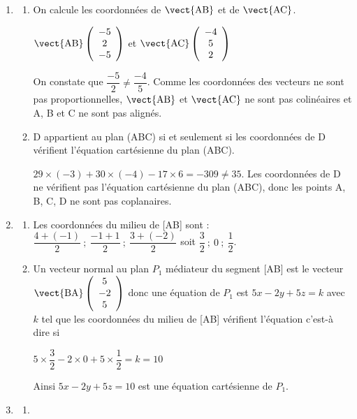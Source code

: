\begin{enumerate}
	\item 
	\begin{enumerate}
		\item On calcule les coordonnées de $\vect{\text{AB}}$ et de $\vect{\text{AC}}$.
		
		$\vect{\text{AB}}\left(
		\begin{array}{c}
		-5\\
		2\\
		-5
		\end{array}
		\right)$
et
		$\vect{\text{AC}}\left(
		\begin{array}{c}
		-4\\
		5\\
		2
		\end{array}
		\right)$
		
		On constate que $\dfrac{-5}{2}\neq \dfrac{-4}{5}$. Comme les coordonnées des vecteurs ne sont pas proportionnelles, 	$\vect{\text{AB}}$ et $\vect{\text{AC}}$ ne sont pas colinéaires et A, B et C ne sont pas alignés.
		\item
D appartient au plan (ABC) si et seulement si les coordonnées de D vérifient l'équation cartésienne du plan (ABC).

$ 29\times (-3) + 30 \times (-4) - 17 \times 6 = -309 \neq 35$. Les coordonnées de D ne vérifient pas  l'équation cartésienne du plan (ABC), donc les points A, B, C, D ne sont pas coplanaires.
	\end{enumerate}
	\item 
	\begin{enumerate}
		\item Les coordonnées du milieu de [AB] sont :
$\dfrac{4+(-1)}{2}~;~\dfrac{-1+1}{2}~;~\dfrac{3+(-2)}{2}$ soit $\dfrac32~;~0~;~\dfrac12$.
	
		\item Un vecteur normal au plan $P_1$ médiateur du segment [AB] est le vecteur $\vect{\text{BA}}\left(
		\begin{array}{c}
		5\\
		-2\\
		5
		\end{array}
		\right)$ donc une équation de $P_1$ est $5x - 2y + 5z = k$ avec $k$ tel que les coordonnées du milieu de [AB] vérifient l'équation c'est-à dire si 

$5\times\dfrac{3}{2} - 2\times 0 + 5\times\dfrac{1}{2} =  k =10$

Ainsi $5x - 2y + 5z = 10$ est une équation cartésienne de $P_1$.
	\end{enumerate}
	\item
	\begin{enumerate}
	\item \ {}


\end{enumerate}
\end{enumerate}
